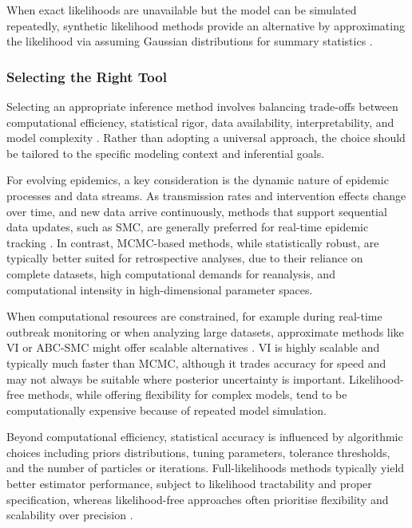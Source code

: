 \documentclass{article}
\begin{document}
When exact likelihoods are unavailable but the model can be simulated repeatedly, synthetic likelihood methods provide an alternative by approximating the likelihood via assuming Gaussian distributions for summary statistics \citep{wood2010statistical, price2018bayesian}. 

\subsubsection{Selecting the Right Tool}

Selecting an appropriate inference method involves balancing trade-offs between computational efficiency, statistical rigor, data availability, interpretability, and model complexity \citep{funk2020choices}. Rather than adopting a universal approach, the choice should be tailored to the specific modeling context and inferential goals. 

For evolving epidemics, a key consideration is the dynamic nature of epidemic processes and data streams. As transmission rates and intervention effects change over time, and new data arrive continuously, methods that support sequential data updates, such as SMC, are generally preferred for real-time epidemic tracking \citep{birrell2020efficient, storvik2023sequential}. In contrast, MCMC-based methods, while statistically robust, are typically better suited for retrospective analyses, due to their reliance on complete datasets, high computational demands for reanalysis, and computational intensity in high-dimensional parameter spaces. 

When computational resources are constrained, for example during real-time outbreak monitoring or when analyzing large datasets, approximate methods like VI or ABC-SMC might offer scalable alternatives \citep{chatzilena2019contemporary, engebretsen2023real}. VI is highly scalable and typically much faster than MCMC, although it trades accuracy for speed and may not always be suitable where posterior uncertainty is important. Likelihood-free methods, while offering flexibility for complex models, tend to be computationally expensive because of repeated model simulation.

Beyond computational efficiency, statistical accuracy is influenced by algorithmic choices including priors distributions, tuning parameters, tolerance thresholds, and the number of particles or iterations. Full-likelihoods methods typically yield better estimator performance, subject to likelihood tractability and proper specification, whereas likelihood-free approaches often prioritise flexibility and scalability over precision \cite{alahmadi2020comparison}. 
\end{document}
